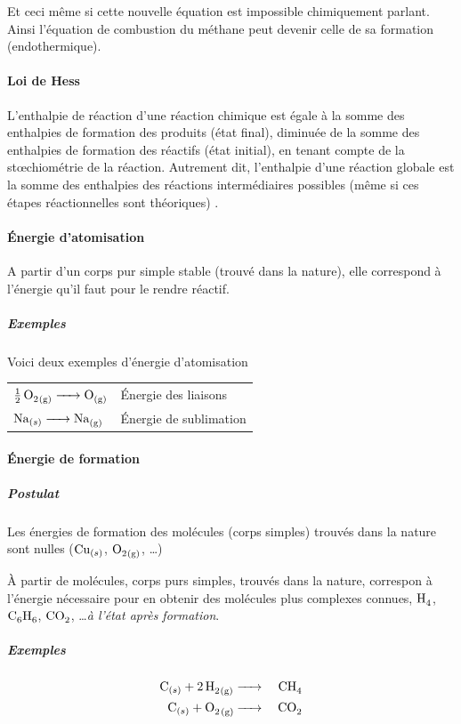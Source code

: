 \documentclass[11pt,a4paper,french]{article}
\newcommand\gaz{_{(g)}}
\begin{document}
Et ceci même si cette nouvelle équation est impossible chimiquement parlant.
Ainsi l'équation de combustion du méthane peut devenir celle de sa formation (endothermique).


\paragraph{Loi de Hess}
L'enthalpie de réaction d'une réaction chimique est égale à la somme des enthalpies
de formation des produits (état final), diminuée de la somme des enthalpies de formation des
réactifs (état initial), en tenant compte de la st\oe{}chiométrie de la réaction.
Autrement dit, l'enthalpie d'une réaction globale est la somme des enthalpies des réactions intermédiaires possibles (même si ces étapes réactionnelles sont théoriques) \cite[pp.~32,33]{legras}.

\paragraph{\'Energie d'atomisation}
A partir d'un corps pur simple stable (trouvé dans la nature), elle correspond à l'énergie qu'il faut pour le rendre réactif.

\subparagraph{Exemples}
Voici deux exemples d'énergie d'atomisation
\begin{center}
	\begin{tabular}{ll}
		$\ce{1/2O2\gaz} \ce{-> O\gaz}$ & \'Energie des liaisons\\
		$\ce{Na}_{(s)} \ce{-> Na\gaz}$ & \'Energie de sublimation
	\end{tabular}
\end{center}

\paragraph{\'Energie de formation}
\subparagraph{Postulat}
Les énergies de formation des molécules (corps simples) trouvés dans la nature sont nulles ($\ce{Cu}_{(s)}$, $\ce{O2\gaz}$, \ldots)

\`A partir de molécules, corps purs simples, trouvés dans la nature, correspon à l'énergie nécessaire pour en obtenir des molécules plus complexes connues, $\ce{H4}$, $\ce{C6H6}$, $\ce{CO2}$, \ldots {\it à l'état après formation}.

\subparagraph{Exemples}
\begin{eqnarray*}
	\ce{C}_{(s)} \ce{+ 2H2\gaz} & \ce{->} & \ce{CH4}\\ %
	\ce{C}_{(s)} \ce{+ O_2 \gaz} & \ce{->} & \ce{CO2} %
\end{eqnarray*}
\end{document}
